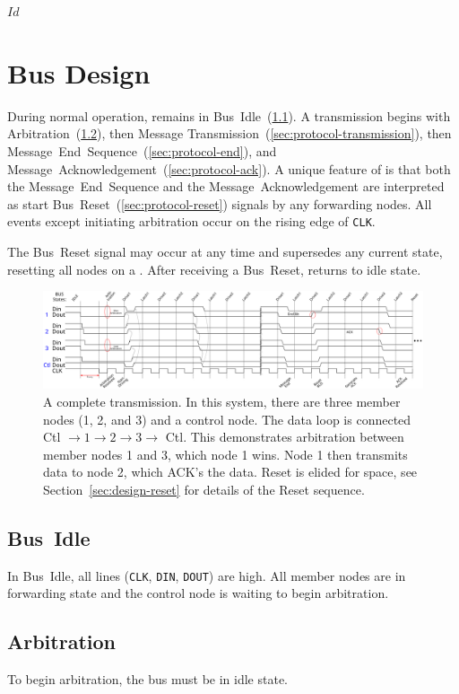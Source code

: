 \svnInfo $Id$

\section{Bus Design}
\label{sec:protocol}
During normal operation, \bus remains in Bus~Idle~(\ref{sec:protocol-idle}).
A transmission begins with Arbitration~(\ref{sec:protocol-arbitration}), then
Message Transmission~(\ref{sec:protocol-transmission}), then
Message~End~Sequence~(\ref{sec:protocol-end}),
and Message~Acknowledgement~(\ref{sec:protocol-ack}). A unique feature of \bus
is that both the Message~End~Sequence and the Message~Acknowledgement are
interpreted as start Bus~Reset~(\ref{sec:protocol-reset}) signals by any
forwarding nodes. All events except initiating arbitration occur on the rising
edge of {\tt CLK}.

The Bus~Reset signal may occur at any time and supersedes any current state,
resetting all nodes on a \bus. After receiving a Bus~Reset, \bus returns to
idle state.

\begin{figure}[h!]
\includegraphics[width=\linewidth]{img/timing}
\caption{A complete transmission. In this system, there are
three member nodes (1, 2, and 3) and a control node. The data loop is connected
Ctl $\rightarrow 1 \rightarrow 2 \rightarrow 3 \rightarrow$ Ctl. This
demonstrates arbitration between member nodes 1 and 3, which node 1 wins. Node
1 then transmits data to node 2, which ACK's the data. Reset is elided for
space, see Section~\ref{sec:design-reset} for details of the Reset sequence.
}
\label{fig:transmission}
\end{figure}

\subsection{Bus~Idle}
\label{sec:protocol-idle}
In \bus Bus~Idle, all lines ({\tt CLK}, {\tt DIN}, {\tt DOUT}) are high.
All member nodes are in forwarding state and the control node is waiting to
begin arbitration.

\subsection{Arbitration}
\label{sec:protocol-arbitration}
To begin arbitration, the bus must be in idle state.


